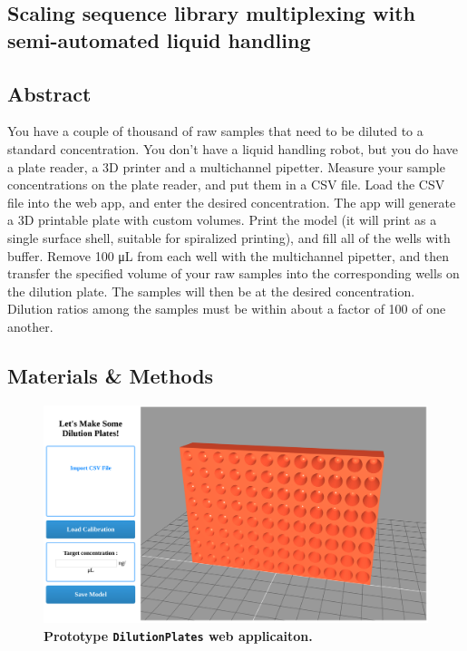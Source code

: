 \begin{refsection}

\chapter{Scaling sequence library multiplexing with semi-automated liquid handling}


\section{Abstract}

You have a couple of thousand of raw samples that need to be diluted to a standard concentration. You don't have a liquid handling robot, but you do have a plate reader, a 3D printer and a multichannel pipetter. Measure your sample concentrations on the plate reader, and put them in a CSV file. Load the CSV file into the web app, and enter the desired concentration. The app will generate a 3D printable plate with custom volumes. Print the model (it will print as a single surface shell, suitable for spiralized printing), and fill all of the wells with buffer. Remove 100 \si{\micro\liter} from each well with the multichannel pipetter, and then transfer the specified volume of your raw samples into the corresponding wells on the dilution plate. The samples will then be at the desired concentration. Dilution ratios among the samples must be within about a factor of 100 of one another.

\section{Materials \& Methods}

\begin{figure}
    \centering
    \includegraphics[width=\textwidth]{DilutionPlates/figures/fig1}
    \caption{\textbf{Prototype {\tt DilutionPlates} web applicaiton.}}
    \label{DP_fig1}
\end{figure}


\end{refsection}
